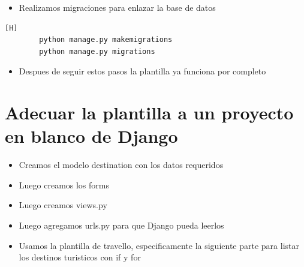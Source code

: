 \documentclass{article}
\begin{document}
	\begin{itemize}
		\item Realizamos migraciones para enlazar la base de datos
	\end{itemize}
	\begin{lstlisting}[language=bash,caption={Codigo para realizar migraciones}][H]
		python manage.py makemigrations
		python manage.py migrations
	\end{lstlisting}
	\begin{itemize}
		\item Despues de seguir estos pasos la plantilla ya funciona por completo
	\end{itemize}
\section{Adecuar la plantilla a un proyecto en blanco de Django}
	\begin{itemize}
		\item Creamos el modelo destination con los datos requeridos
	\end{itemize}

	\begin{itemize}
\section{Crear formularios de Añadir Destinos Turísticos, Modificar, Listar y Eliminar Destinos. }
		\item Luego creamos los forms 
	\end{itemize}

	\begin{itemize}
		\item Luego creamos views.py
	\end{itemize}	

	\begin{itemize}
		\item Luego agregamos urls.py para que Django pueda leerlos
	\end{itemize}	
	
	\begin{itemize}
		\item Usamos la  plantilla de travello, especificamente la siguiente parte para listar los destinos turisticos con if y for
	\end{itemize}	
\end{document}
